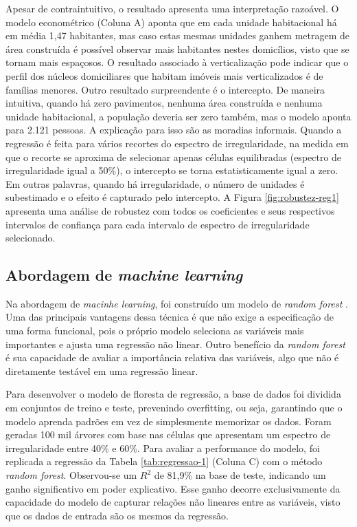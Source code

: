 Apesar de contraintuitivo, o resultado apresenta uma interpretação razoável. O modelo econométrico (Coluna A) aponta que em cada unidade habitacional há em média 1,47 habitantes, mas caso estas mesmas unidades ganhem metragem de área construída é possível observar mais habitantes nestes domicílios, visto que se tornam mais espaçosos. O resultado associado à verticalização pode indicar que o perfil dos núcleos domiciliares que habitam imóveis mais verticalizados é de famílias menores. Outro resultado surpreendente é o intercepto. De maneira intuitiva, quando há zero pavimentos, nenhuma área construída e nenhuma unidade habitacional, a população deveria ser zero também, mas o modelo aponta para 2.121 pessoas. A explicação para isso são as moradias informais. Quando a regressão é feita para vários recortes do espectro de irregularidade, na medida em que o recorte se aproxima de selecionar apenas células equilibradas (espectro de irregularidade igual a 50\%), o intercepto se torna estatisticamente igual a zero. Em outras palavras, quando há irregularidade, o número de unidades é subestimado e o efeito é capturado pelo intercepto. A Figura \ref{fig:robustez-reg1} apresenta uma análise de robustez com todos os coeficientes e seus respectivos intervalos de confiança para cada intervalo de espectro de irregularidade selecionado.

\subsection{Abordagem de \textit{machine learning}}

Na abordagem de \textit{macinhe learning}, foi construído um modelo de \textit{random forest} \cite{wright2015ranger}. Uma das principais vantagens dessa técnica é que não exige a especificação de uma forma funcional, pois o próprio modelo seleciona as variáveis mais importantes e ajusta uma regressão não linear. Outro benefício da \textit{random forest} é sua capacidade de avaliar a importância relativa das variáveis, algo que não é diretamente testável em uma regressão linear.


Para desenvolver o modelo de floresta de regressão, a base de dados foi dividida em conjuntos de treino e teste, prevenindo overfitting, ou seja, garantindo que o modelo aprenda padrões em vez de simplesmente memorizar os dados. Foram geradas 100 mil árvores com base nas células que apresentam um espectro de irregularidade entre 40\% e 60\%. Para avaliar a performance do modelo, foi replicada a regressão da Tabela \ref{tab:regressao-1} (Coluna C) com o método \textit{random forest}. Observou-se um $R^2$ de 81,9\% na base de teste, indicando um ganho significativo em poder explicativo. Esse ganho decorre exclusivamente da capacidade do modelo de capturar relações não lineares entre as variáveis, visto que os dados de entrada são os mesmos da regressão.

